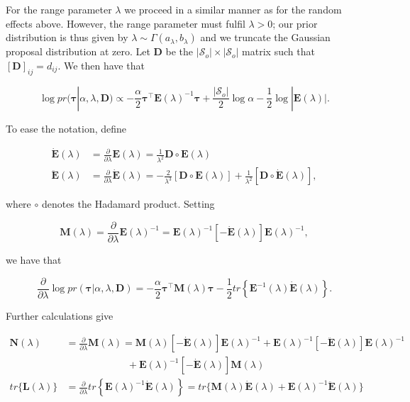\documentclass[11pt,english]{article}
\newcommand{\bs}[1]{\boldsymbol{#1}}
\newcommand{\mc}[1]{\mathcal{#1}}
\newcommand{\pderiv}[2]{\frac{\partial #1}{\partial #2}}
\newcommand{\bl}{\begin{linenomath}}
\newcommand{\el}{\end{linenomath}}
\begin{document}
For the range parameter $\lambda$ we proceed in a similar manner as for the random effects above. However, the range parameter must fulfil $\lambda > 0$; our prior distribution is thus given by $\lambda \sim \Gamma (a_\lambda, b_\lambda)$ and we truncate the Gaussian proposal distribution at zero.  Let $\bs{D}$ be the $|\mc{S}_o| \times |\mc{S}_o|$ matrix such that $[\bs{D}]_{ij} = d_{ij}$.  We then have that
\bl $$
\log pr(\bs{\tau}|\alpha,\lambda, \bs{D}) \propto -\frac{\alpha}{2} \bs{\tau}^\top \bs{E}(\lambda)^{-1} \bs{\tau} + \frac{|\mc{S}_o|}{2} \log \alpha - \frac{1}{2} \log |\bs{E}(\lambda)|.
$$\el
To ease the notation, define
\bl\begin{align*}
\dot{\bs{E}}(\lambda) &= \frac{\partial}{\partial \lambda} \bs{E}(\lambda) = \frac{1}{\lambda^2}\bs{D} \circ \bs{E}(\lambda)\\
\ddot{\bs{E}}(\lambda)&= \pderiv{}{\lambda} \dot{\bs{E}}(\lambda) = -\frac{2}{\lambda^3}[\bs{D}\circ \bs{E}(\lambda)] + \frac{1}{\lambda^2}[\bs{D}\circ \dot{\bs{E}}(\lambda)],
\end{align*}\el
where $\circ$ denotes the Hadamard product.
Setting 
\bl\[
\bs{M}(\lambda) = \pderiv{}{\lambda} \bs{E}(\lambda)^{-1} = \bs{E}(\lambda)^{-1}[-\dot{\bs{E}}(\lambda)]\bs{E}(\lambda)^{-1},
\]\el
we have that
\bl\[
\pderiv{}{\lambda}\log pr(\bs{\tau}|\alpha, \lambda, \bs{D}) = - \frac{\alpha}{2} \bs{\tau}^\top \bs{M}(\lambda)\bs{\tau} -\frac{1}{2} tr\left\{\bs{E}^{-1}(\lambda)\dot{\bs{E}}(\lambda)\right\}. 
\]\el
Further calculations give
\bl\begin{align*}
\bs{N}(\lambda) & = \pderiv{}{\lambda}\bs{M}(\lambda) = \bs{M}(\lambda)[-\dot{\bs{E}}(\lambda)]\bs{E}(\lambda)^{-1} + \bs{E}(\lambda)^{-1}[-\ddot{\bs{E}}(\lambda)]\bs{E}(\lambda)^{-1}\\
& \qquad \qquad \qquad \, + \bs{E}(\lambda)^{-1}[-\dot{\bs{E}}(\lambda)]\bs{M}(\lambda) \\
tr\Big\{\bs{L}(\lambda)\Big\} & =  \pderiv{}{\lambda} tr\left\{ \bs{E}(\lambda)^{-1}\dot{\bs{E}}(\lambda)\right\} = tr\Big\{\bs{M}(\lambda)\dot{\bs{E}}(\lambda) + \bs{E}(\lambda)^{-1}\ddot{\bs{E}}(\lambda)\Big\}\\
\end{align*}\el
\end{document}
